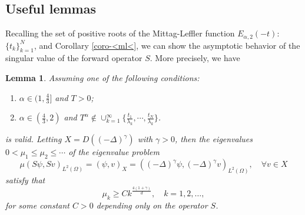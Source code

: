 \documentclass[11pt]{article}
\newtheorem{lemma}{Lemma}[section]
\numberwithin{equation}{section}
\begin{document}
\subsection{Useful lemmas}
Recalling the set of positive roots of the Mittag-Leffler function $E_{\alpha,2}(-t)$: $\{t_k\}_{k=1}^N$, and Corollary \ref{coro-<ml<}, we can show the asymptotic behavior of the singular value of the forward operator $S$. More precisely, we have
\begin{lemma}\label{lem-eigen-H1}
Assuming one of the following conditions:
\begin{enumerate}[label = \roman*.]
    \item $\alpha\in (1,\frac43]$ and $T>0$;
    \item $\alpha\in(\frac43,2)$ and $T^\alpha \not\in \cup_{k=1}^\infty \{ \frac{t_1}{\lambda_k}, \cdots, \frac{t_N}{\lambda_k}\}$.
\end{enumerate}
is valid. Letting $X=D((-\Delta )^\gamma)$ with $\gamma>0$, then the eigenvalues  $  0 < \mu_1 \leq \mu_2 \leq \cdots  $  of the eigenvalue problem
\begin{equation}\label{eigen-S*S}
\mu (S\psi, Sv)_{L^2(\Omega)}=(\psi, v)_{X}=
((-\Delta)^{\gamma}\psi, (-\Delta)^{\gamma}v)_{L^2(\Omega)} ,\quad \forall v \in X
\end{equation}
satisfy that
$$
\mu_k \geq  C k^{\frac{4(1+\gamma)}d},\quad k = 1, 2, \ldots,
$$ for some constant  $  C >0 $  depending only on the operator $S$.
\end{lemma}
\end{document}
